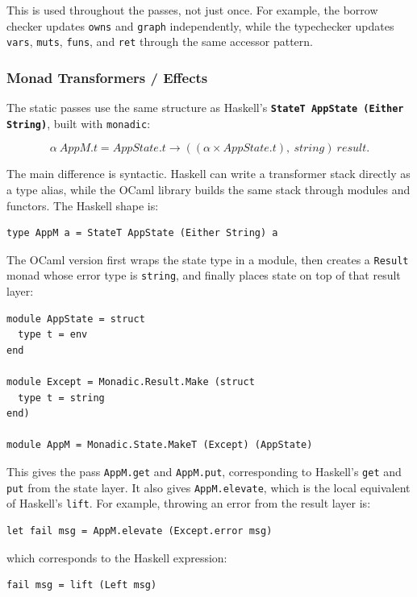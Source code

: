 \documentclass[a4paper]{article}
\begin{document}
This is used throughout the passes, not just once. For example, the borrow
checker updates \texttt{owns} and \texttt{graph} independently, while the
typechecker updates \texttt{vars}, \texttt{muts}, \texttt{funs}, and
\texttt{ret} through the same accessor pattern.

\subsubsection{Monad Transformers / Effects}

The static passes use the same structure as Haskell's \textbf{\texttt{StateT
AppState (Either String)}}, built with \texttt{monadic}:

\[
  \alpha\ AppM.t = AppState.t \to ((\alpha \times AppState.t),\ string)\ result.
\]

The main difference is syntactic. Haskell can write a transformer stack directly
as a type alias, while the OCaml library builds the same stack through modules
and functors. The Haskell shape is:

\begin{lstlisting}
type AppM a = StateT AppState (Either String) a
\end{lstlisting}

The OCaml version first wraps the state type in a module, then creates a
\texttt{Result} monad whose error type is \texttt{string}, and finally places
state on top of that result layer:

\begin{lstlisting}
module AppState = struct
  type t = env
end

module Except = Monadic.Result.Make (struct
  type t = string
end)

module AppM = Monadic.State.MakeT (Except) (AppState)
\end{lstlisting}

This gives the pass \texttt{AppM.get} and \texttt{AppM.put}, corresponding to
Haskell's \texttt{get} and \texttt{put} from the state layer. It also gives
\texttt{AppM.elevate}, which is the local equivalent of Haskell's \texttt{lift}.
For example, throwing an error from the result layer is:

\begin{lstlisting}
let fail msg = AppM.elevate (Except.error msg)
\end{lstlisting}

which corresponds to the Haskell expression:

\begin{lstlisting}
fail msg = lift (Left msg)
\end{lstlisting}
\end{document}
